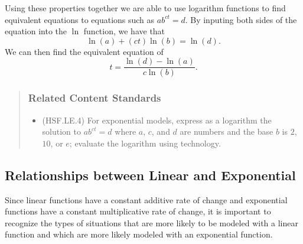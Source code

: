 \documentclass[
]{book}
\providecommand{\tightlist}{%
  \setlength{\itemsep}{0pt}\setlength{\parskip}{0pt}}
\theoremstyle{definition}
\theoremstyle{definition}
\theoremstyle{definition}
\theoremstyle{remark}
\begin{document}
Using these properties together we are able to use logarithm functions to find equivalent equations to equations such as \(a b^{ct}=d\). By inputing both sides of the equation into the \(\ln\) function, we have that
\[\ln(a) + (ct)\ln(b) = \ln (d).\] We can then find the equivalent equation of
\[t= \frac{\ln(d)-\ln(a)}{c\ln(b)}.\]

\begin{quote}
\hypertarget{related-content-standards-45}{%
\subsubsection*{Related Content Standards}\label{related-content-standards-45}}

\begin{itemize}
\tightlist
\item
  (HSF.LE.4) For exponential models, express as a logarithm the solution to \(a b^{ct}=d\) where \(a\), \(c\), and \(d\) are numbers and the base \(b\) is \(2\), \(10\), or \(e\); evaluate the logarithm using technology.
\end{itemize}
\end{quote}

\hypertarget{relationships-between-linear-and-exponential}{%
\subsection{Relationships between Linear and Exponential}\label{relationships-between-linear-and-exponential}}

Since linear functions have a constant additive rate of change and exponential functions have a constant multiplicative rate of change, it is important to recognize the types of situations that are more likely to be modeled with a linear function and which are more likely modeled with an exponential function.
\end{document}

